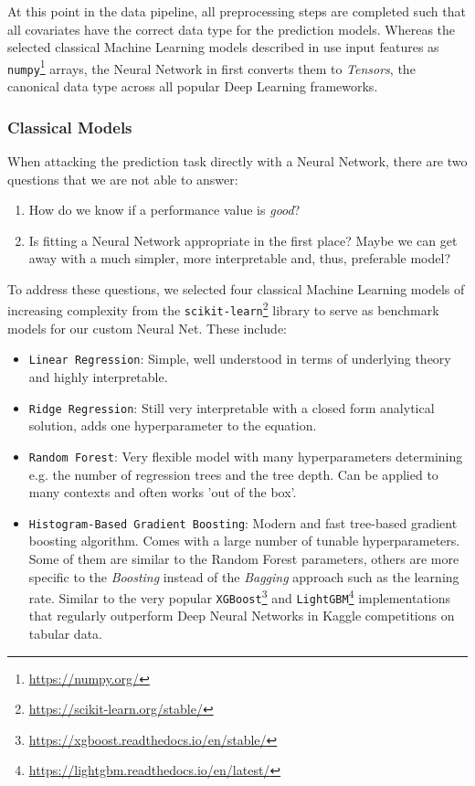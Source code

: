 At this point in the data pipeline, all preprocessing steps are completed such that all covariates have the correct data type for the prediction models.
Whereas the selected classical Machine Learning models described in  use input features as \texttt{numpy}\footnote{\url{https://numpy.org/}} arrays, the Neural Network in  first converts them to \emph{Tensors}, the canonical data type across all popular Deep Learning frameworks.

\subsubsection{Classical Models} \label{classical-models}

When attacking the prediction task directly with a Neural Network, there are two questions that we are not able to answer:
\begin{enumerate}
  \item How do we know if a performance value is \emph{good}?
  \item Is fitting a Neural Network appropriate in the first place?
        Maybe we can get away with a much simpler, more interpretable and, thus, preferable model?
\end{enumerate}
To address these questions, we selected four classical Machine Learning models of increasing complexity from the \texttt{scikit-learn}\footnote{\url{https://scikit-learn.org/stable/}} library \citep{pedregosa2011} to serve as benchmark models for our custom Neural Net.
These include:
\begin{itemize}
  \item \texttt{Linear Regression}:
        Simple, well understood in terms of underlying theory and highly interpretable.
  \item \texttt{Ridge Regression}:
        Still very interpretable with a closed form analytical solution, adds one hyperparameter to the equation.
  \item \texttt{Random Forest}:
        Very flexible model with many hyperparameters determining e.g. the number of regression trees and the tree depth.
        Can be applied to many contexts and often works 'out of the box'.
  \item \texttt{Histogram-Based Gradient Boosting}:
        Modern and fast tree-based gradient boosting algorithm.
        Comes with a large number of tunable hyperparameters.
        Some of them are similar to the Random Forest parameters, others are more specific to the \emph{Boosting} instead of the \emph{Bagging} approach such as the learning rate.
        Similar to the very popular \texttt{XGBoost}\footnote{\url{https://xgboost.readthedocs.io/en/stable/}} \citep{chen2016} and \texttt{LightGBM}\footnote{\url{https://lightgbm.readthedocs.io/en/latest/}} \citep{ke2017} implementations that regularly outperform Deep Neural Networks in Kaggle competitions on tabular data.
\end{itemize}

